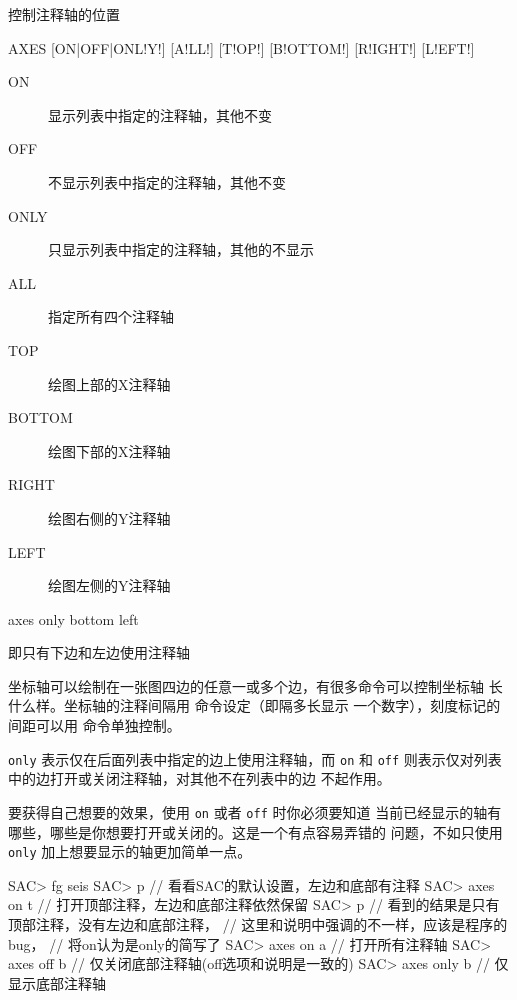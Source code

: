 \label{cmd:axes}

控制注释轴的位置

\begin{SACSTX}
AXES [ON|OFF|ONL!Y!] [A!LL!] [T!OP!] [B!OTTOM!] [R!IGHT!] [L!EFT!]
\end{SACSTX}

\begin{description}
\item [ON] 显示列表中指定的注释轴，其他不变
\item [OFF] 不显示列表中指定的注释轴，其他不变
\item [ONLY] 只显示列表中指定的注释轴，其他的不显示
\item [ALL] 指定所有四个注释轴
\item [TOP] 绘图上部的X注释轴
\item [BOTTOM] 绘图下部的X注释轴
\item [RIGHT] 绘图右侧的Y注释轴
\item [LEFT] 绘图左侧的Y注释轴
\end{description}

\begin{SACDFT}
axes only bottom left
\end{SACDFT}
即只有下边和左边使用注释轴

坐标轴可以绘制在一张图四边的任意一或多个边，有很多命令可以控制坐标轴
长什么样。坐标轴的注释间隔用  命令设定（即隔多长显示
一个数字），刻度标记的间距可以用  命令单独控制。

\texttt{only} 表示仅在后面列表中指定的边上使用注释轴，而 \texttt{on} 和
\texttt{off} 则表示仅对列表中的边打开或关闭注释轴，对其他不在列表中的边
不起作用。

要获得自己想要的效果，使用 \texttt{on} 或者 \texttt{off} 时你必须要知道
当前已经显示的轴有哪些，哪些是你想要打开或关闭的。这是一个有点容易弄错的
问题，不如只使用 \texttt{only} 加上想要显示的轴更加简单一点。

\begin{SACCode}
SAC> fg seis
SAC> p           // 看看SAC的默认设置，左边和底部有注释
SAC> axes on t   // 打开顶部注释，左边和底部注释依然保留
SAC> p           // 看到的结果是只有顶部注释，没有左边和底部注释，
                 // 这里和说明中强调的不一样，应该是程序的bug，
                 // 将on认为是only的简写了
SAC> axes on a   // 打开所有注释轴
SAC> axes off b  // 仅关闭底部注释轴(off选项和说明是一致的)
SAC> axes only b // 仅显示底部注释轴
\end{SACCode}
